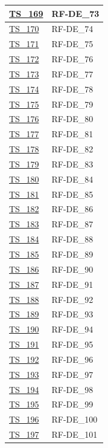 \begin{longtable}{|
		>{\raggedright\arraybackslash}p{} |
		>{\centering\arraybackslash}p{} |
	}
	\hyperlink{ts-169}{TS\_169} & RF-DE\_73 \\ \hline
	\hyperlink{ts-170}{TS\_170} & RF-DE\_74 \\ \hline
	\hyperlink{ts-171}{TS\_171} & RF-DE\_75 \\ \hline
	\hyperlink{ts-172}{TS\_172} & RF-DE\_76 \\ \hline
	\hyperlink{ts-173}{TS\_173} & RF-DE\_77 \\ \hline
	\hyperlink{ts-174}{TS\_174} & RF-DE\_78 \\ \hline
	\hyperlink{ts-175}{TS\_175} & RF-DE\_79 \\ \hline
	\hyperlink{ts-176}{TS\_176} & RF-DE\_80 \\ \hline
	\hyperlink{ts-177}{TS\_177} & RF-DE\_81 \\ \hline
	\hyperlink{ts-178}{TS\_178} & RF-DE\_82 \\ \hline
	\hyperlink{ts-179}{TS\_179} & RF-DE\_83 \\ \hline
	\hyperlink{ts-180}{TS\_180} & RF-DE\_84 \\ \hline
	\hyperlink{ts-181}{TS\_181} & RF-DE\_85 \\ \hline
	\hyperlink{ts-182}{TS\_182} & RF-DE\_86 \\ \hline
	\hyperlink{ts-183}{TS\_183} & RF-DE\_87 \\ \hline
	\hyperlink{ts-184}{TS\_184} & RF-DE\_88 \\ \hline
	\hyperlink{ts-185}{TS\_185} & RF-DE\_89 \\ \hline
	\hyperlink{ts-186}{TS\_186} & RF-DE\_90 \\ \hline
	\hyperlink{ts-187}{TS\_187} & RF-DE\_91 \\ \hline
	\hyperlink{ts-188}{TS\_188} & RF-DE\_92 \\ \hline
	\hyperlink{ts-189}{TS\_189} & RF-DE\_93 \\ \hline
	\hyperlink{ts-190}{TS\_190} & RF-DE\_94 \\ \hline
	\hyperlink{ts-191}{TS\_191} & RF-DE\_95 \\ \hline
	\hyperlink{ts-192}{TS\_192} & RF-DE\_96 \\ \hline
	\hyperlink{ts-193}{TS\_193} & RF-DE\_97 \\ \hline
	\hyperlink{ts-194}{TS\_194} & RF-DE\_98 \\ \hline
	\hyperlink{ts-195}{TS\_195} & RF-DE\_99 \\ \hline
	\hyperlink{ts-196}{TS\_196} & RF-DE\_100 \\ \hline
	\hyperlink{ts-197}{TS\_197} & RF-DE\_101 \\ \hline

\end{longtable}
